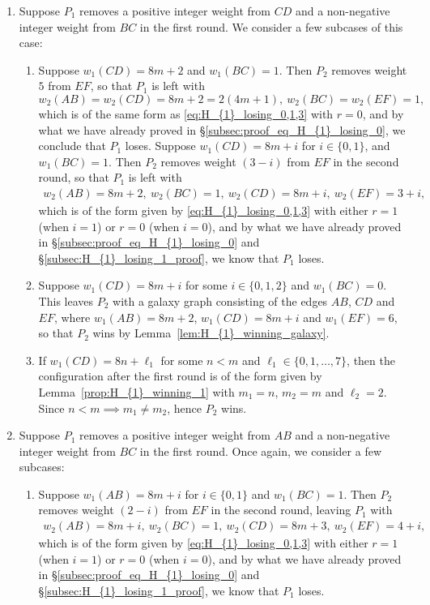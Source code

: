 \documentclass[11pt,reqno]{amsart}
\theoremstyle{definition}
\theoremstyle{definition}
\begin{document}
\begin{enumerate}
\item Suppose $P_{1}$ removes a positive integer weight from $CD$ and a non-negative integer weight from $BC$ in the first round. We consider a few subcases of this case:
\begin{enumerate}
\item Suppose $w_{1}(CD)=8m+2$ and $w_{1}(BC)=1$. Then $P_{2}$ removes weight $5$ from $EF$, so that $P_{1}$ is left with
\begin{equation}
w_{2}(AB)=w_{2}(CD)=8m+2=2(4m+1),\ w_{2}(BC)=w_{2}(EF)=1,\nonumber
\end{equation}
which is of the same form as \eqref{eq:H_{1}_losing_0,1,3} with $r=0$, and by what we have already proved in \S\ref{subsec:proof_eq_H_{1}_losing_0}, we conclude that $P_{1}$ loses. Suppose $w_{1}(CD)=8m+i$ for $i \in\{0,1\}$, and $w_{1}(BC)=1$. Then $P_{2}$ removes weight $(3-i)$ from $EF$ in the second round, so that $P_{1}$ is left with 
\begin{align}
w_{2}(AB)=8m+2,\ w_{2}(BC)=1,\ w_{2}(CD)=8m+i,\ w_{2}(EF)=3+i,\nonumber
\end{align}
which is of the form given by \eqref{eq:H_{1}_losing_0,1,3} with either $r=1$ (when $i=1$) or $r=0$ (when $i=0$), and by what we have already proved in \S\ref{subsec:proof_eq_H_{1}_losing_0} and \S\ref{subsec:H_{1}_losing_1_proof}, we know that $P_{1}$ loses. 

\item Suppose $w_{1}(CD)=8m+i$ for some $i \in \{0,1,2\}$ and $w_{1}(BC)=0$. This leaves $P_{2}$ with a galaxy graph consisting of the edges $AB$, $CD$ and $EF$, where $w_{1}(AB)=8m+2$, $w_{1}(CD)=8m+i$ and $w_{1}(EF)=6$, so that $P_{2}$ wins by Lemma~\ref{lem:H_{1}_winning_galaxy}.

\item \label{item_1} If $w_{1}(CD)=8n+\ell_{1}$ for some $n < m$ and $\ell_{1} \in \{0,1,\ldots,7\}$, then the configuration after the first round is of the form given by Lemma~\ref{prop:H_{1}_winning_1} with $m_{1}=n$, $m_{2}=m$ and $\ell_{2}=2$. Since $n<m \implies m_{1}\neq m_{2}$, hence $P_{2}$ wins.
\end{enumerate}

\item Suppose $P_{1}$ removes a positive integer weight from $AB$ and a non-negative integer weight from $BC$ in the first round. Once again, we consider a few subcases:
\begin{enumerate}
\item Suppose $w_{1}(AB)=8m+i$ for $i \in \{0,1\}$ and $w_{1}(BC)=1$. Then $P_{2}$ removes weight $(2-i)$ from $EF$ in the second round, leaving $P_{1}$ with
\begin{align}
w_{2}(AB)=8m+i,\ w_{2}(BC)=1,\ w_{2}(CD)=8m+3,\ w_{2}(EF)=4+i,\nonumber
\end{align}
which is of the form given by \eqref{eq:H_{1}_losing_0,1,3} with either $r=1$ (when $i=1$) or $r=0$ (when $i=0$), and by what we have already proved in \S\ref{subsec:proof_eq_H_{1}_losing_0} and \S\ref{subsec:H_{1}_losing_1_proof}, we know that $P_{1}$ loses.


\end{enumerate}
\end{enumerate}
\end{document}
